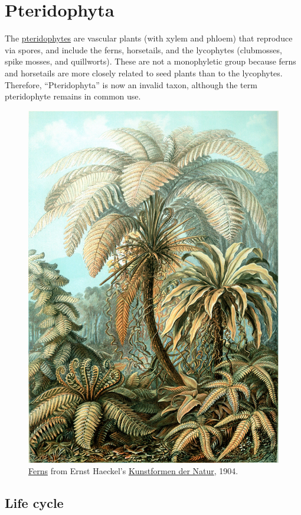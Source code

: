 \section{Pteridophyta}\label{pteridophyta}

The \href{https://en.wikipedia.org/wiki/Pteridophyte}{pteridophytes} are
vascular plants (with xylem and phloem) that reproduce via spores, and
include the ferns, horsetails, and the lycophytes (clubmosses, spike
mosses, and quillworts). These are not a monophyletic group because
ferns and horsetails are more closely related to seed plants than to the
lycophytes. Therefore, ``Pteridophyta'' is now an invalid taxon,
although the term pteridophyte remains in common use.

\begin{figure}

{\centering \includegraphics[width=0.7\linewidth]{./figures/mosses/Haeckel_Filicinae_92}

}

\caption{\href{https://commons.wikimedia.org/wiki/File:Haeckel_Filicinae_92.jpg}{Ferns}
from Ernst Haeckel's
\href{https://en.wikipedia.org/wiki/Kunstformen_der_Natur}{Kunstformen
der Natur}, 1904.}\label{fig:ferns}
\end{figure}

\subsection{Life cycle}\label{life-cycle-2}

